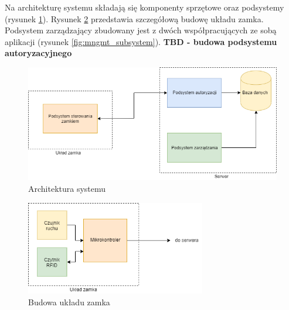             Na architekturę systemu składają się komponenty sprzętowe oraz podsystemy (rysunek \ref{fig:hl-arch}). Rysunek \ref{fig:lock-arch} przedstawia szczegółową budowę układu zamka. Podsystem zarządzający zbudowany jest z dwóch współpracujących ze sobą aplikacji (rysunek \ref{fig:mngmt_subsystem}). \textbf{TBD - budowa podsystemu autoryzacyjnego} 

            \begin{figure}[h!]
                \includegraphics[width=\linewidth]{chapters/images/hl-arch3.png}
                \caption{Architektura systemu}
                \label{fig:hl-arch}
            \end{figure}

            \vspace{10mm} 

            \begin{figure}[h!]
                \centering
                \includegraphics[width=0.7\textwidth]{chapters/images/lock.png}
                \caption{Budowa układu zamka}
                \label{fig:lock-arch}
            \end{figure}

